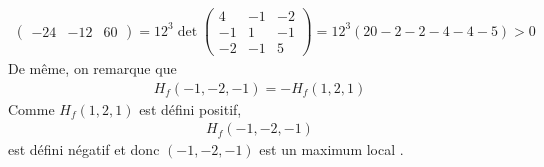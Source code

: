 \begin{enumerate}
\begin{align*}
\begin{pmatrix}
                -24 & -12 & 60
            \end{pmatrix} = 12^3\det\begin{pmatrix}
                4 & -1 & -2 \\
                -1 & 1 & -1 \\
                -2 & -1 & 5
            \end{pmatrix} = 12^3(20-2-2-4-4-5) > 0
        \end{align*}
        De même, on remarque que 
        \begin{align*}
            H_f(-1,-2,-1) = -H_f(1,2,1)
        \end{align*}
        Comme $H_f(1,2,1)$ est défini positif,
        \begin{align*}
            H_f(-1,-2,-1)
        \end{align*}
        est défini négatif 
        et donc $(-1,-2,-1)$ est un maximum local .
    \end{enumerate}
